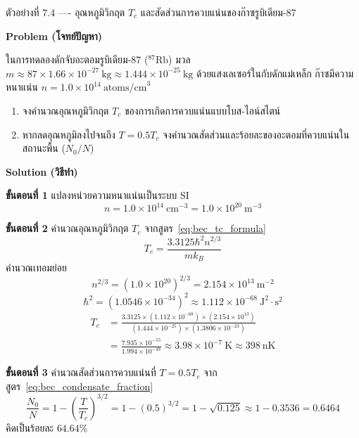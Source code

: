 \begin{psctbox}{ตัวอย่างที่ 7.4 ---- อุณหภูมิวิกฤต $T_c$ และสัดส่วนการควบแน่นของก๊าซรูบิเดียม-87}

\textbf{Problem (โจทย์ปัญหา)}

ในการทดลองดักจับอะตอมรูบิเดียม-87 ($^{87}\text{Rb}$) มวล $m \approx 87 \times 1.66 \times 10^{-27}~\text{kg} \approx 1.444 \times 10^{-25}~\text{kg}$ ด้วยแสงเลเซอร์ในกับดักแม่เหล็ก ก๊าซมีความหนาแน่น $n = 1.0 \times 10^{14}~\text{atoms/cm}^3$
\begin{enumerate}
    \item จงคำนวณอุณหภูมิวิกฤต $T_c$ ของการเกิดการควบแน่นแบบโบส-ไอน์สไตน์
    \item หากลดอุณหภูมิลงไปจนถึง $T = 0.5 T_c$ จงคำนวณสัดส่วนและร้อยละของอะตอมที่ควบแน่นในสถานะพื้น ($N_0/N$)
\end{enumerate}

\textbf{Solution (วิธีทำ)}

\textbf{ขั้นตอนที่ 1} แปลงหน่วยความหนาแน่นเป็นระบบ SI
\begin{equation*}
n = 1.0 \times 10^{14}~\text{cm}^{-3} = 1.0 \times 10^{20}~\text{m}^{-3}
\end{equation*}

\textbf{ขั้นตอนที่ 2} คำนวณอุณหภูมิวิกฤต $T_c$ จากสูตร~\eqref{eq:bec_tc_formula}
\begin{equation*}
T_c = \frac{3.3125 \hbar^2 n^{2/3}}{m k_B}
\end{equation*}
คำนวณเทอมย่อย
\begin{equation*}
n^{2/3} = (1.0 \times 10^{20})^{2/3} = 2.154 \times 10^{13}~\text{m}^{-2}
\end{equation*}
\begin{equation*}
\hbar^2 = (1.0546 \times 10^{-34})^2 \approx 1.112 \times 10^{-68}~\text{J}^2\cdot\text{s}^2
\end{equation*}
\begin{align*}
T_c &= \frac{3.3125 \times (1.112 \times 10^{-68}) \times (2.154 \times 10^{13})}{(1.444 \times 10^{-25}) \times (1.3806 \times 10^{-23})} \\
&= \frac{7.935 \times 10^{-55}}{1.994 \times 10^{-48}} \approx 3.98 \times 10^{-7}~\text{K} \approx 398~\text{nK}
\end{align*}

\textbf{ขั้นตอนที่ 3} คำนวณสัดส่วนการควบแน่นที่ $T = 0.5 T_c$
จากสูตร~\eqref{eq:bec_condensate_fraction}
\begin{equation*}
\frac{N_0}{N} = 1 - \left( \frac{T}{T_c} \right)^{3/2} = 1 - (0.5)^{3/2} = 1 - \sqrt{0.125} \approx 1 - 0.3536 = 0.6464
\end{equation*}
คิดเป็นร้อยละ $64.64\%$


\end{psctbox}
